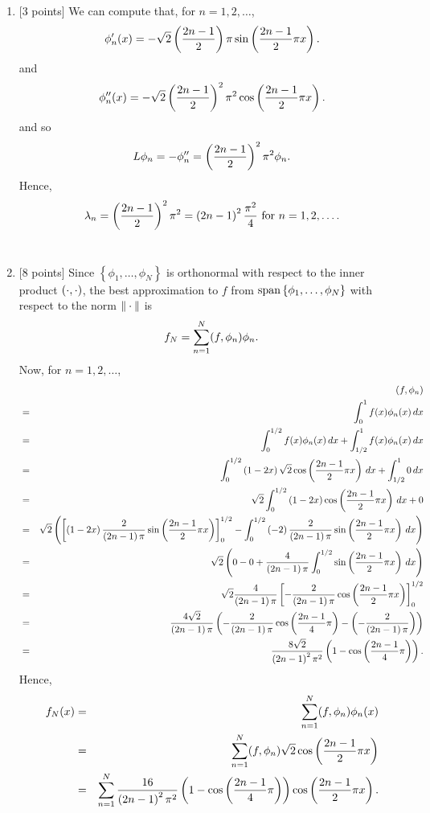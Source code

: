\begin{solution}
\begin{enumerate}
\item {[3 points]} We can compute that, for $n=1,2,\ldots$,
\[
\phi_n'(x)=-\sqrt{2} \left({2n-1\over 2}\right) \pi \sin\left({2n-1\over 2} \pi x\right).
\]
and
\[
\phi_n''(x)=-\sqrt{2} \left({2n-1\over 2}\right)^2 \pi^2 \cos\left({2n-1\over 2} \pi x\right).
\]
and so
\[
L\phi_n=-\phi_n''=\left({2n-1\over 2}\right)^2\pi^2\phi_n.
\]
Hence,
\[
\lambda_n = \left({2n-1\over 2}\right)^2 \pi^2 = \left(2n-1\right)^2 {\pi^2\over4}\mbox{ for } n = 1, 2, \ldots.
\]
\\
\item {[8 points]} Since $\left\{\phi_1,\ldots,\phi_N\right\}$ is orthonormal with respect to the inner product $(\cdot,\cdot)$, the best approximation to $f$ from ${\rm span}\left\{\phi_1,\ldots,\phi_N\right\}$ with respect to the norm $\|\cdot\|$ is
\[
f_N=\sum_{n=1}^N(f,\phi_n)\phi_n.
\]
Now, for $n=1,2,\ldots$,
\begin{eqnarray*}
&&(f,\phi_n)
\\
&=&\int_0^1f(x)\phi_n(x)\,dx
\\
&=&\int_0^{1/2}f(x)\phi_n(x)\,dx+\int_{1/2}^1f(x)\phi_n(x)\,dx
\\
&=&\int_0^{1/2}\left(1-2x\right)\sqrt{2}\cos\left({2n-1\over 2}\pi x\right)\,dx+\int_{1/2}^10\,dx
\\
&=&\sqrt{2}\int_0^{1/2}\left(1-2x\right)\cos\left({2n-1\over 2}\pi x\right)\,dx+0
\\
&=&\sqrt{2}\left(\left[\left(1-2x\right){2\over \left(2n-1\right)\pi}\sin\left({2n-1\over 2}\pi x\right)\right]_0^{1/2}-\int_0^{1/2}\left(-2\right){2\over \left(2n-1\right)\pi}\sin\left({2n-1\over 2}\pi x\right)\,dx\right)
\\
&=&\sqrt{2}\left(0-0+{4\over \left(2n-1\right)\pi}\int_0^{1/2}\sin\left({2n-1\over 2}\pi x\right)\,dx\right)
\\
&=&\sqrt{2}{4\over \left(2n-1\right)\pi}\left[-{2\over \left(2n-1\right)\pi}\cos\left({2n-1\over 2}\pi x\right)\right]_0^{1/2}
\\
&=&{4\sqrt{2}\over \left(2n-1\right)\pi}\left(-{2\over \left(2n-1\right)\pi}\cos\left({2n-1\over 4}\pi \right)-\left(-{2\over \left(2n-1\right)\pi}\right)\right)
\\
&=&{8\sqrt{2}\over \left(2n-1\right)^2\pi^2}\left(1-\cos\left({2n-1\over 4}\pi \right)\right).
\end{eqnarray*}
Hence,
\begin{eqnarray*}
f_N(x)&=&\sum_{n=1}^N(f,\phi_n)\phi_n(x)
\\
&=&\sum_{n=1}^N(f,\phi_n)\sqrt{2}\cos\left({2n-1\over 2}\pi x\right)
\\
&=&\sum_{n=1}^N{16\over \left(2n-1\right)^2\pi^2}\left(1-\cos\left({2n-1\over 4}\pi \right)\right)\cos\left({2n-1\over 2}\pi x\right).
\end{eqnarray*}


\end{enumerate}
\end{solution}
